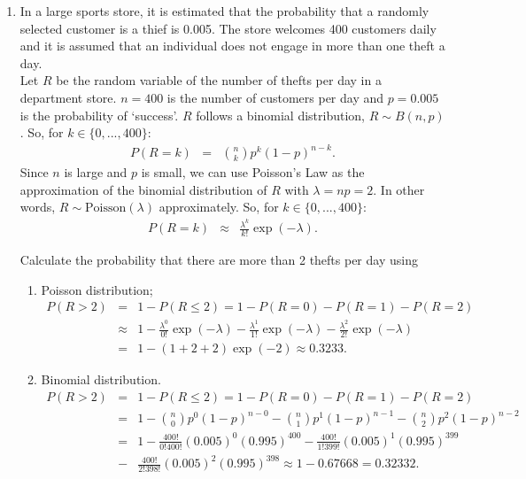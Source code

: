 \documentclass[12pt,thmsa]{article}\usepackage[]{graphicx}\usepackage[]{color}
\begin{document}
\begin{enumerate}%

\item In a large sports store, it is estimated that the probability that a randomly selected customer is a thief is 0.005. The store welcomes 400 customers daily and it is assumed that an individual does not engage in more than one theft a day.\\

Let $ R $ be the random variable of the number of thefts per day in a department store. $ n = 400$ is the number of customers per day and $ p = 0.005$ is the probability of `success'. $ R $ follows a binomial distribution, $R \sim B(n,p)$. So, for $k \in \{0,...,400\}$:
\begin{eqnarray*}
P(R=k) & = & \left. \binom{n}{k}p^{k}(1-p)^{n-k}. \right. \nonumber
\end{eqnarray*}
Since $ n $ is large and $ p $ is small, we can use Poisson's Law as the approximation of the binomial distribution of $ R $ with $\lambda=np=2$. In other words, $R \sim \text{Poisson}(\lambda)$ approximately. So, for $k \in \{0,...,400\}$:
\begin{eqnarray*}
P(R=k) & \approx & \left. \frac{\lambda^{k}}{k!}\exp(-\lambda). \right. \nonumber
\end{eqnarray*}



\noindent Calculate the probability that there are more than 2 thefts per day using
\begin{enumerate}
\item Poisson distribution;
\begin{eqnarray*}
P(R>2) & = & \left. 1- P(R \leq 2) = 1- P(R=0)-P(R=1)-P(R=2) \right. \nonumber \\
& \approx & \left. 1-\frac{\lambda^{0}}{0!}\exp(-\lambda) - \frac{\lambda^{1}}{1!}\exp(-\lambda) - \frac{\lambda^{2}}{2!}\exp(-\lambda) \right. \nonumber \\
& = & \left. 1-(1+2+2)\exp(-2) \approx 0.3233. \right. \nonumber
\end{eqnarray*}
\item Binomial distribution.
\begin{eqnarray*}
P(R>2) & = & \left. 1- P(R \leq 2) = 1- P(R=0)-P(R=1)-P(R=2) \right. \nonumber \\
& = & \left. 1- \binom{n}{0}p^{0}(1-p)^{n-0}-\binom{n}{1}p^{1}(1-p)^{n-1} - \binom{n}{2}p^{2}(1-p)^{n-2} \right. \nonumber \\
& = & \left.  1-\frac{400!}{0!400!}(0.005)^{0}(0.995)^{400} -\frac{400!}{1!399!}(0.005)^{1}(0.995)^{399} \right. \nonumber \\
& -&\left. \frac{400!}{2!398!}(0.005)^{2}(0.995)^{398} \approx  1 - 0.67668 = 0.32332.  \right. \nonumber
\end{eqnarray*}
\end{enumerate}


\end{enumerate}
\end{document}
